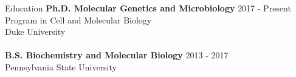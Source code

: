 \documentclass{resume} %
\begin{document}




\begin{rSection}{Education}
{\bf Ph.D. Molecular Genetics and Microbiology } \hfill {2017 - Present} 
\\ Program in Cell and Molecular Biology
\\ Duke University
\\ \\
{\bf B.S. Biochemistry and Molecular Biology} \hfill {2013 - 2017} 
\\ Pennsylvania State University
\\
\end{rSection}
\end{document}
